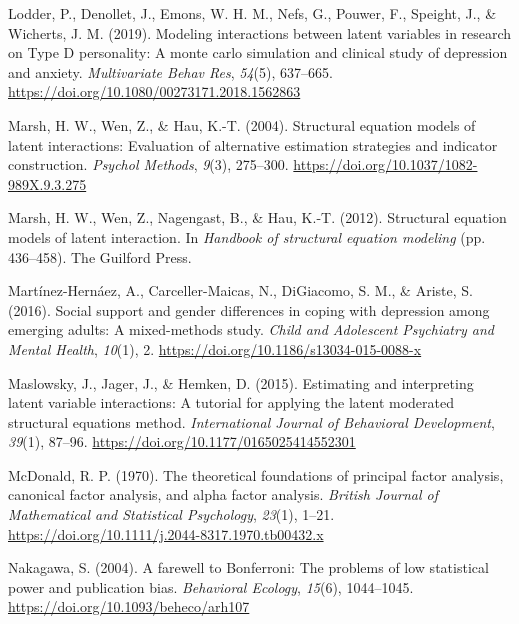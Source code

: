 \documentclass[
  man]{apa7}
\newlength{\cslhangindent}
\newlength{\cslentryspacingunit} %
\newenvironment{CSLReferences}[2] %
 {%
  \setlength{\parindent}{0pt}
  \ifodd #1
  \let\oldpar\par
  \def\par{\hangindent=\cslhangindent\oldpar}
  \fi
  \setlength{\parskip}{#2\cslentryspacingunit}
 }%
 {}
\begin{document}
\begin{CSLReferences}{1}{0}
\leavevmode{}%
Lodder, P., Denollet, J., Emons, W. H. M., Nefs, G., Pouwer, F., Speight, J., \& Wicherts, J. M. (2019). Modeling interactions between latent variables in research on {Type D} personality: {A} monte carlo simulation and clinical study of depression and anxiety. \emph{Multivariate Behav Res}, \emph{54}(5), 637--665. \url{https://doi.org/10.1080/00273171.2018.1562863}

\leavevmode{}%
Marsh, H. W., Wen, Z., \& Hau, K.-T. (2004). Structural equation models of latent interactions: Evaluation of alternative estimation strategies and indicator construction. \emph{Psychol Methods}, \emph{9}(3), 275--300. \url{https://doi.org/10.1037/1082-989X.9.3.275}

\leavevmode{}%
Marsh, H. W., Wen, Z., Nagengast, B., \& Hau, K.-T. (2012). Structural equation models of latent interaction. In \emph{Handbook of structural equation modeling} (pp. 436--458). The Guilford Press.

\leavevmode{}%
Martínez-Hernáez, A., Carceller-Maicas, N., DiGiacomo, S. M., \& Ariste, S. (2016). Social support and gender differences in coping with depression among emerging adults: A mixed-methods study. \emph{Child and Adolescent Psychiatry and Mental Health}, \emph{10}(1), 2. \url{https://doi.org/10.1186/s13034-015-0088-x}

\leavevmode{}%
Maslowsky, J., Jager, J., \& Hemken, D. (2015). Estimating and interpreting latent variable interactions: {A} tutorial for applying the latent moderated structural equations method. \emph{International Journal of Behavioral Development}, \emph{39}(1), 87--96. \url{https://doi.org/10.1177/0165025414552301}

\leavevmode{}%
McDonald, R. P. (1970). The theoretical foundations of principal factor analysis, canonical factor analysis, and alpha factor analysis. \emph{British Journal of Mathematical and Statistical Psychology}, \emph{23}(1), 1--21. \url{https://doi.org/10.1111/j.2044-8317.1970.tb00432.x}

\leavevmode{}%
Nakagawa, S. (2004). A farewell to {Bonferroni}: {The} problems of low statistical power and publication bias. \emph{Behavioral Ecology}, \emph{15}(6), 1044--1045. \url{https://doi.org/10.1093/beheco/arh107}


\end{CSLReferences}
\end{document}
